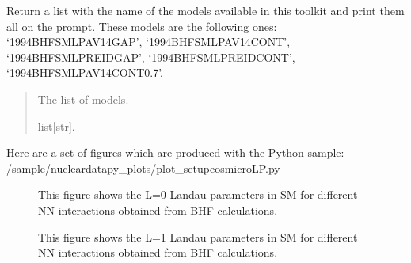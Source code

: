 \documentclass[letterpaper,10pt,english]{sphinxmanual}
\begin{document}
\begin{fulllineitems}
\label{\detokenize{source/api/setup_eos_micro_lp:nucleardatapy.setup_eos_micro_lp.eos_micro_LP_models}}
\pysigstartsignatures
\pysiglinewithargsret
{}
{}
{}
\pysigstopsignatures
\sphinxAtStartPar
Return a list with the name of the models available in this toolkit and     print them all on the prompt. These models are the following ones:     ‘1994\sphinxhyphen{}BHF\sphinxhyphen{}SM\sphinxhyphen{}LP\sphinxhyphen{}AV14\sphinxhyphen{}GAP’, ‘1994\sphinxhyphen{}BHF\sphinxhyphen{}SM\sphinxhyphen{}LP\sphinxhyphen{}AV14\sphinxhyphen{}CONT’,     ‘1994\sphinxhyphen{}BHF\sphinxhyphen{}SM\sphinxhyphen{}LP\sphinxhyphen{}REID\sphinxhyphen{}GAP’, ‘1994\sphinxhyphen{}BHF\sphinxhyphen{}SM\sphinxhyphen{}LP\sphinxhyphen{}REID\sphinxhyphen{}CONT’, ‘1994\sphinxhyphen{}BHF\sphinxhyphen{}SM\sphinxhyphen{}LP\sphinxhyphen{}AV14\sphinxhyphen{}CONT\sphinxhyphen{}0.7’.
\begin{quote}\begin{description}
\sphinxAtStartPar
The list of models.

\sphinxAtStartPar
list{[}str{]}.

\end{description}\end{quote}

\end{fulllineitems}


\sphinxAtStartPar
Here are a set of figures which are produced with the Python sample: /sample/nucleardatapy\_plots/plot\_setupeosmicroLP.py

\begin{figure}[htbp]
\centering
\capstart

\noindent{}
\caption{This figure shows the L=0 Landau parameters in SM for different NN interactions obtained
from BHF calculations.}\label{\detokenize{source/api/setup_eos_micro_lp:id1}}\end{figure}

\begin{figure}[htbp]
\centering
\capstart

\noindent{}
\caption{This figure shows the L=1 Landau parameters in SM for different NN interactions obtained
from BHF calculations.}\label{\detokenize{source/api/setup_eos_micro_lp:id2}}\end{figure}
\end{document}
